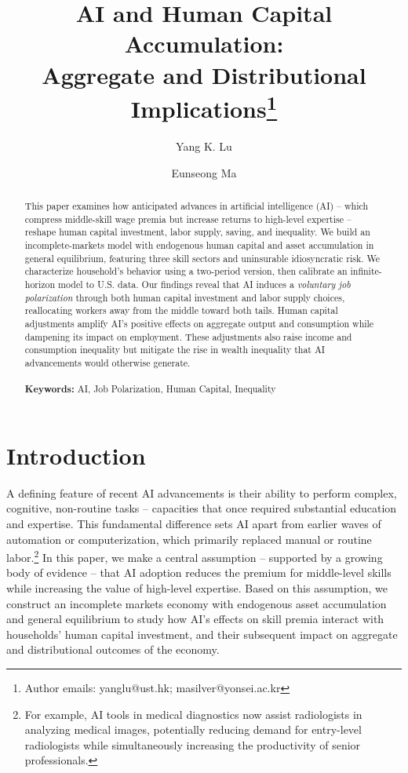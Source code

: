 \documentclass[12pt]{article}
\author[1]{Yang K. Lu}
\author[2]{Eunseong Ma}
\affil[1]{HKUST}
\affil[2]{Yonsei}
\title{\LARGE AI and Human Capital Accumulation: \\ Aggregate and Distributional Implications\footnote{Author emails: yanglu@ust.hk; masilver@yonsei.ac.kr}}
\begin{document}
\maketitle


\begin{abstract}
This paper examines how anticipated advances in artificial intelligence (AI) -- which compress middle-skill wage premia but increase returns to high-level expertise -- reshape human capital investment, labor supply, saving, and inequality. We build an incomplete-markets model with endogenous human capital and asset accumulation in general equilibrium, featuring three skill sectors and uninsurable idiosyncratic risk. We characterize household's behavior using a two-period version, then calibrate an infinite-horizon model to U.S. data. Our findings reveal that AI induces a \textit{voluntary job polarization} through both human capital investment and labor supply choices, reallocating workers away from the middle toward both tails. Human capital adjustments amplify AI’s positive effects on aggregate output and consumption while dampening its impact on employment. These adjustments also raise income and consumption inequality but mitigate the rise in wealth inequality that AI advancements would otherwise generate.\\
\\
\textbf{Keywords:} AI, Job Polarization, Human Capital, Inequality
\end{abstract}
\linenumbers

\newpage

\section{Introduction}
\label{sec:introduction}

A defining feature of recent AI advancements is their ability to perform complex, cognitive, non-routine tasks -- capacities that once required substantial education and expertise. This fundamental difference sets AI apart from earlier waves of automation or computerization, which primarily replaced manual or routine labor.\footnote{For example, AI tools in medical diagnostics now assist radiologists in analyzing medical images, potentially reducing demand for entry-level radiologists while simultaneously increasing the productivity of senior professionals.} In this paper, we make a central assumption -- supported by a growing body of evidence -- that AI adoption reduces the premium for middle-level skills while increasing the value of high-level expertise. Based on this assumption, we construct an incomplete markets economy with endogenous asset accumulation and general equilibrium to study how AI's effects on skill premia interact with households' human capital investment, and their subsequent impact on aggregate and distributional outcomes of the economy.
\end{document}

